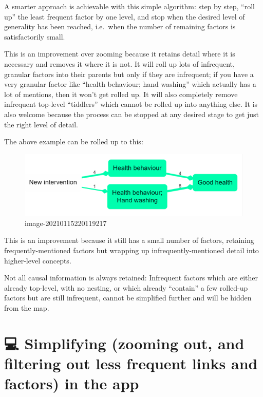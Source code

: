 \documentclass[
]{book}
\begin{document}
A smarter approach is achievable with this simple algorithm: step by step, ``roll up'' the least frequent factor by one level, and stop when the desired level of generality has been reached, i.e.~when the number of remaining factors is satisfactorily small.

This is an improvement over zooming because it retains detail where it is necessary and removes it where it is not. It will roll up lots of infrequent, granular factors into their parents but only if they are infrequent; if you have a very granular factor like ``health behaviour; hand washing'' which actually has a lot of mentions, then it won't get rolled up. It will also completely remove infrequent top-level ``tiddlers'' which cannot be rolled up into anything else. It is also welcome because the process can be stopped at any desired stage to get just the right level of detail.

The above example can be rolled up to this:

\begin{figure}
\centering
\includegraphics{_assets/image-20210115220119217.png}
\caption{image-20210115220119217}
\end{figure}

This is an improvement because it still has a small number of factors, retaining frequently-mentioned factors but wrapping up infrequently-mentioned detail into higher-level concepts.

Not all causal information is always retained: Infrequent factors which are either already top-level, with no nesting, or which already ``contain'' a few rolled-up factors but are still infrequent, cannot be simplified further and will be hidden from the map.

\hypertarget{simplifying-zooming-out-and-filtering-out-less-frequent-links-and-factors-in-the-app}{%
\section{💻 Simplifying (zooming out, and filtering out less frequent links and factors) in the app}\label{simplifying-zooming-out-and-filtering-out-less-frequent-links-and-factors-in-the-app}}
\end{document}
